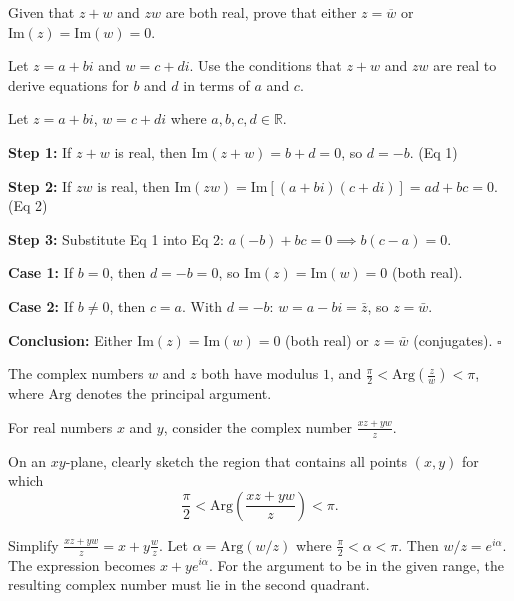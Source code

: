 \begin{problem}
Given that $z + w$ and $zw$ are both real, prove that either $z = \overline{w}$ or $\text{Im}(z) = \text{Im}(w) = 0$.
\end{problem}

\begin{hint}
Let $z = a + bi$ and $w = c + di$. Use the conditions that $z + w$ and $zw$ are real to derive equations for $b$ and $d$ in terms of $a$ and $c$.
\end{hint}

\begin{solution}[Proof]
Let $z = a+bi$, $w = c+di$ where $a,b,c,d \in \mathbb{R}$.

\textbf{Step 1:} If $z+w$ is real, then $\text{Im}(z+w) = b+d = 0$, so $d=-b$. \quad (Eq 1)

\textbf{Step 2:} If $zw$ is real, then $\text{Im}(zw) = \text{Im}[(a+bi)(c+di)] = ad+bc = 0$. \quad (Eq 2)

\textbf{Step 3:} Substitute Eq 1 into Eq 2: $a(-b)+bc=0 \implies b(c-a)=0$.

\textbf{Case 1:} If $b=0$, then $d=-b=0$, so $\text{Im}(z)=\text{Im}(w)=0$ (both real).

\textbf{Case 2:} If $b \neq 0$, then $c=a$. With $d=-b$: $w = a-bi = \bar{z}$, so $z=\bar{w}$.

\textbf{Conclusion:} Either $\text{Im}(z)=\text{Im}(w)=0$ (both real) or $z=\bar{w}$ (conjugates). \quad $\square$
\end{solution}

\begin{problem}
The complex numbers $w$ and $z$ both have modulus $1$, and $\frac{\pi}{2} < \text{Arg}\left(\frac{z}{w}\right) < \pi$, where $\text{Arg}$ denotes the principal argument.

For real numbers $x$ and $y$, consider the complex number $\frac{xz + yw}{z}$.

On an $xy$-plane, clearly sketch the region that contains all points $(x, y)$ for which
\[
\frac{\pi}{2} < \text{Arg}\left(\frac{xz + yw}{z}\right) < \pi.
\]
\end{problem}

\begin{hint}
Simplify $\frac{xz + yw}{z} = x + y\frac{w}{z}$. Let $\alpha = \text{Arg}(w/z)$ where $\frac{\pi}{2} < \alpha < \pi$. Then $w/z = e^{i\alpha}$. The expression becomes $x + ye^{i\alpha}$. For the argument to be in the given range, the resulting complex number must lie in the second quadrant.
\end{hint}

